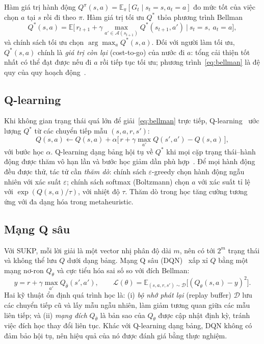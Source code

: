 Hàm giá trị hành động $Q^\pi(s,a)=\mathbb{E}_\pi[G_t\mid s_t=s,a_t=a]$ đo mức tốt của việc chọn $a$ tại $s$ rồi đi theo $\pi$. Hàm giá trị tối ưu $Q^*$ thỏa phương trình Bellman
\begin{equation}
Q^*(s,a)=\mathbb{E}\Big[\,r_{t+1}+\gamma\max_{a'\in\mathcal{A}(s_{t+1})}Q^*(s_{t+1},a')\ \Big|\ s_t=s,\ a_t=a\Big],
\label{eq:bellman}
\end{equation}
và chính sách tối ưu chọn $\arg\max_a Q^*(s,a)$. Đối với người làm tối ưu, $Q^*(s,a)$ chính là \emph{giá trị còn lại} (cost-to-go) của nước đi $a$: tổng cải thiện tốt nhất có thể đạt được nếu đi $a$ rồi tiếp tục tối ưu; phương trình~\eqref{eq:bellman} là đệ quy của quy hoạch động~\cite{Bertsekas1996}.

\subsection{Q-learning}

Khi không gian trạng thái quá lớn để giải~\eqref{eq:bellman} trực tiếp, Q-learning~\cite{Watkins1992} ước lượng $Q^*$ từ các chuyển tiếp mẫu $(s,a,r,s')$:
\begin{equation}
Q(s,a)\leftarrow Q(s,a)+\alpha\Big[\,r+\gamma\max_{a'}Q(s',a')-Q(s,a)\,\Big],
\end{equation}
với bước học $\alpha$. Q-learning dạng bảng hội tụ về $Q^*$ khi mọi cặp trạng thái--hành động được thăm vô hạn lần và bước học giảm dần phù hợp~\cite{Watkins1992}. Để mọi hành động đều được thử, tác tử cần \emph{thăm dò}: chính sách $\varepsilon$-greedy chọn hành động ngẫu nhiên với xác suất $\varepsilon$; chính sách softmax (Boltzmann) chọn $a$ với xác suất tỉ lệ với $\exp(Q(s,a)/\tau)$, với nhiệt độ $\tau$. Thăm dò trong học tăng cường tương ứng với đa dạng hóa trong metaheuristic.

\subsection{Mạng Q sâu}

Với SUKP, mỗi lời giải là một vector nhị phân độ dài $m$, nên có tới $2^m$ trạng thái và không thể lưu $Q$ dưới dạng bảng. Mạng Q sâu (DQN)~\cite{Mnih2015} xấp xỉ $Q$ bằng một mạng nơ-ron $Q_\theta$ và cực tiểu hóa sai số so với đích Bellman:
\begin{equation}
y=r+\gamma\max_{a'}Q_{\bar\theta}(s',a'),
\qquad
\mathcal{L}(\theta)=\mathbb{E}_{(s,a,r,s')\sim\mathcal{D}}\big[(Q_\theta(s,a)-y)^2\big].
\label{eq:dqn}
\end{equation}
Hai kỹ thuật ổn định quá trình học là: (i) \emph{bộ nhớ phát lại} (replay buffer) $\mathcal{D}$ lưu các chuyển tiếp cũ và lấy mẫu ngẫu nhiên, làm giảm tương quan giữa các mẫu liên tiếp; và (ii) \emph{mạng đích} $Q_{\bar\theta}$ là bản sao của $Q_\theta$ được cập nhật định kỳ, tránh việc đích học thay đổi liên tục. Khác với Q-learning dạng bảng, DQN không có đảm bảo hội tụ, nên hiệu quả của nó được đánh giá bằng thực nghiệm.

